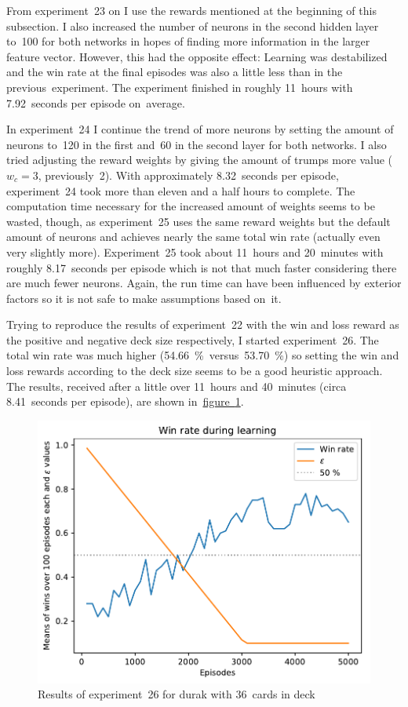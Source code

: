 \documentclass[a4paper,titlepage]{article}
\begin{document}
From experiment~23 on I use the rewards mentioned at the beginning of this subsection. I also increased the number of neurons in the second hidden layer to~100 for both networks in hopes of finding more information in the larger feature vector. However, this had the opposite effect: Learning was destabilized and the win rate at the final episodes was also a little less than in the previous~experiment. The experiment finished in roughly 11~hours with 7.92~seconds per episode on~average.

In experiment~24 I continue the trend of more neurons by setting the amount of neurons to~120 in the first and~60 in the second layer for both networks. I also tried adjusting the reward weights by giving the amount of trumps more value ($w_c = 3$, previously~2). With approximately 8.32~seconds per episode, experiment~24 took more than eleven and a half hours to complete. The computation time necessary for the increased amount of weights seems to be wasted, though, as experiment~25 uses the same reward weights but the default amount of neurons and achieves nearly the same total win rate (actually even very slightly more). Experiment~25 took about 11~hours and 20~minutes with roughly 8.17~seconds per episode which is not that much faster considering there are much fewer neurons. Again, the run time can have been influenced by exterior factors so it is not safe to make assumptions based on~it.

Trying to reproduce the results of experiment~22 with the win and loss reward as the positive and negative deck size respectively, I started experiment~26. The total win rate was much higher (54.66~\%~versus~53.70~\%) so setting the win and loss rewards according to the deck size seems to be a good heuristic approach. The results, received after a little over 11~hours and 40~minutes (circa 8.41~seconds per episode), are shown in~\hyperref[fig:exp26]{figure~\ref*{fig:exp26}}.
\begin{figure}
  \centering
  \includegraphics[width=\textwidth]{../experiments/exp26/win_stats.pdf}
  \caption{Results of experiment~26 for durak with 36~cards in deck}
  \label{fig:exp26}
\end{figure}
\end{document}
